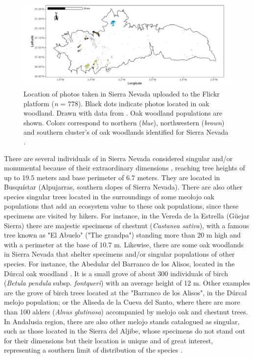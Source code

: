 \begin{figure}
    \centering
    \includegraphics[width=\textwidth]{img/es/es-flicker.pdf}\caption{Location of photos taken in Sierra Nevada uploaded to the Flickr platform (\emph{n} = 778). Black dots indicate photos located in oak woodland. Drawn with data from \citet{RosCandeiraetal2020SocialMedia}. Oak woodland populations are shown. Colors correspond to northern (\emph{blue}), northwestern (\emph{brown}) and southern cluster's of oak woodlands identified for Sierra Nevada \autocite{PerezLuqueetal2021EcologicalDiversity}.  
}\label{fig:es:flicker}
\end{figure}
 
There are several individuals of \Qp in Sierra Nevada considered singular and/or monumental because of their extraordinary dimensions \autocite{IruritaFernandezetal2003ArbolesArboledas}, reaching tree heights of up to 19.5 meters and base perimeter of 6.7 meters. They are located in Busquístar (Alpujarras, southern slopes of Sierra Nevada). There are also other species singular trees located in the surroundings of some meolojo oak populations that add an ecosystem value to these oak populations, since these specimens are visited by hikers. For instance, in the Vereda de la Estrella (Güejar Sierra) there are majestic specimens of chestnut (\emph{Castanea sativa}), with a famous tree known as "El Abuelo" ("The grandpa") standing more than 20 m high and with a perimeter at the base of 10.7 m. Likewise, there are some oak woodlands in Sierra Nevada that shelter specimens and/or singular populations of other species. For instance, the Abedular del Barranco de los Alisos, located in the Dúrcal oak woodland \autocites{MartinezLabargaetal1990AbedularRelictico}. It is a small grove of about 300 individuals of birch (\emph{Betula pendula} subsp. \emph{fontqueri}) with an average height of 12 m. Other examples are the grove of birch trees located at the "Barranco de los Alisos", in the Dúrcal melojo population; or the Aliseda de la Cueva del Santo, where there are more than 100 alders (\emph{Alnus glutinosa}) accompanied by melojo oak and chestnut trees. In Andalusia region, there are also other melojo stands catalogued as singular, such as those located in the Sierra del Aljibe, whose specimens do not stand out for their dimensions but their location is unique and of great interest, representing a southern limit of distribution of the species \autocite{SanchezGarciaetal2003ArbolesArboledas}. 

